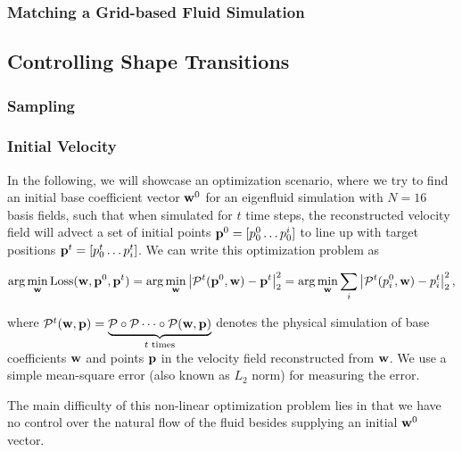 \subsubsection*{Matching a Grid-based Fluid Simulation}

\subsection{Controlling Shape Transitions}
\label{section:controlling-shape-transitions}

\subsubsection*{Sampling}

\subsubsection{Initial Velocity}

In the following, we will showcase an optimization scenario, where we try to
find an initial base coefficient vector $\vb{w}^{0}$ for an eigenfluid
simulation with $N=16$ basis fields, such that when simulated for $t$ time
steps, the reconstructed velocity field will advect a set of initial points
$\vb{p}^0 = [p^0_0\dots p^i_0]$ to line up with target positions 
$\vb{p}^{t} = [p^t_0\dots p^t_i]$. We can write this optimization problem as 

$$\arg\min_{\vb{w}} \text{Loss}(\vb{w}, \vb{p}^0, \vb{p}^t)
= \arg\min_{\vb{w}} \left| \mathcal{P}^{t}(\vb{p}^0, \vb{w})
- \vb{p}^t\right|_2^2 = \arg\min_{\vb{w}}
\sum_{i}\left|\mathcal{P}^{t}(p^0_i, \vb{w}) - p^t_i\right|_2^2, $$

where $\mathcal{P}^t(\vb{w}, \vb{p}) = \underbrace{\mathcal{P} \circ
\mathcal{P} \dots \circ \mathcal{P}(\vb{w}, \vb{p})}_{t \text{ times}}$
denotes the physical simulation of base coefficients $\vb{w}$ and 
points $\vb{p}$ in the velocity field reconstructed from $\vb{w}$. We
use a simple mean-square error (also known as $L_2$ norm) for measuring the error.

The main difficulty of this non-linear optimization problem lies in that we have
no control over the natural flow of the fluid besides supplying an initial
$\vb{w}^0$ vector.

